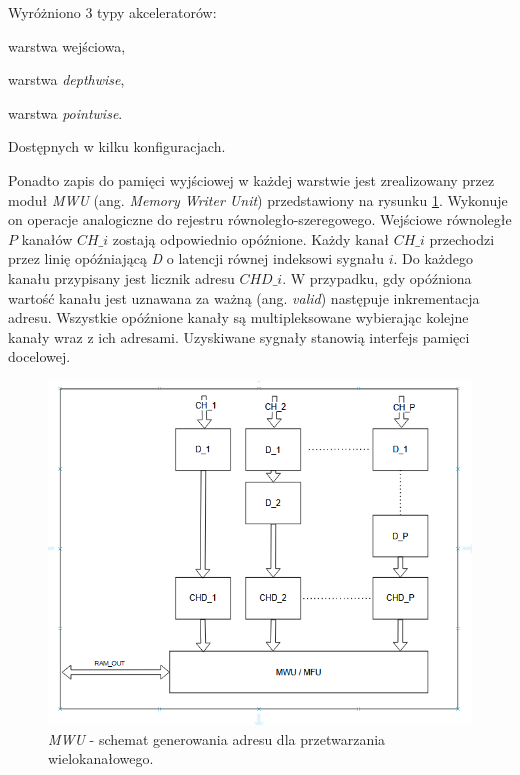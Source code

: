 Wyróżniono 3 typy akceleratorów:
\begin{description}
\item warstwa wejściowa,
\item warstwa \emph{depthwise},
\item warstwa \emph{pointwise}.
\end{description}
Dostępnych w kilku konfiguracjach.

Ponadto zapis do pamięci wyjściowej w każdej warstwie jest zrealizowany przez moduł \emph{MWU} (ang. \emph{Memory Writer Unit}) przedstawiony na rysunku \ref{fig:mwu}.
Wykonuje on operacje analogiczne do rejestru równoległo-szeregowego.
Wejściowe równoległe $P$ kanałów $CH\_i$ zostają odpowiednio opóźnione. 
Każdy kanał $CH\_{i}$ przechodzi przez linię opóźniającą \emph{D} o latencji równej indeksowi sygnału $i$.
Do każdego kanału przypisany jest licznik adresu $CHD\_i$.
W przypadku, gdy opóźniona wartość kanału jest uznawana za ważną (ang. \emph{valid}) następuje inkrementacja adresu.
Wszystkie opóźnione kanały są multipleksowane wybierając kolejne kanały wraz z ich adresami.
Uzyskiwane sygnały stanowią interfejs pamięci docelowej.

\begin{figure}
    \centering
    \includegraphics[width=0.8\linewidth]{images/MWU.png}
    \caption{\emph{MWU} - schemat generowania adresu dla przetwarzania wielokanałowego.}
    \label{fig:mwu}
\end{figure}

